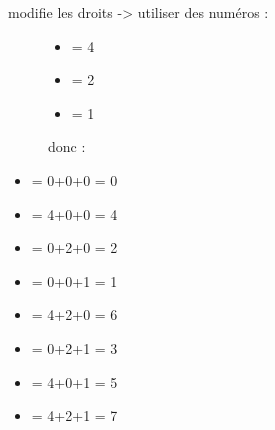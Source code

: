 \documentclass[letterpaper,10pt,french]{sphinxmanual}
\begin{document}
\begin{description}
\begin{itemize}
\end{itemize}

\item[{\sphinxcode{\sphinxupquote{chmod}}}] \leavevmode\begin{description}
\item[{modifie les droits -\textgreater{} utiliser des numéros :}] \leavevmode\begin{itemize}
\item {} 
 = 4

\item {} 
 = 2

\item {} 
 = 1

\end{itemize}

donc :

\end{description}
\begin{itemize}
\item {} 
\sphinxcode{\sphinxupquote{-{-}-}} = 0+0+0 = 0

\item {} 
 = 4+0+0 = 4

\item {} 
 = 0+2+0 = 2

\item {} 
 = 0+0+1 = 1

\item {} 
 = 4+2+0 = 6

\item {} 
 = 0+2+1 = 3

\item {} 
 = 4+0+1 = 5

\item {} 
 = 4+2+1 = 7

\end{itemize}

\item[{\sphinxcode{\sphinxupquote{chmod 600 rapport.txt}}}] \leavevmode
{}

\end{description}
\end{document}
